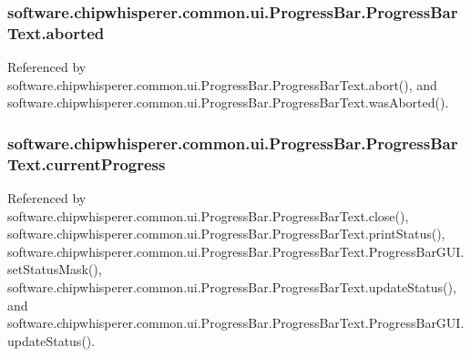 \subsubsection[{aborted}]{\setlength{\rightskip}{0pt plus 5cm}software.\+chipwhisperer.\+common.\+ui.\+Progress\+Bar.\+Progress\+Bar\+Text.\+aborted}\label{classsoftware_1_1chipwhisperer_1_1common_1_1ui_1_1ProgressBar_1_1ProgressBarText_a052477c7d2664f0188e8eec56ca57285}


Referenced by software.\+chipwhisperer.\+common.\+ui.\+Progress\+Bar.\+Progress\+Bar\+Text.\+abort(), and software.\+chipwhisperer.\+common.\+ui.\+Progress\+Bar.\+Progress\+Bar\+Text.\+was\+Aborted().

\hypertarget{classsoftware_1_1chipwhisperer_1_1common_1_1ui_1_1ProgressBar_1_1ProgressBarText_a090a37de67926fae5d5042142a064df7}{}
\subsubsection[{current\+Progress}]{\setlength{\rightskip}{0pt plus 5cm}software.\+chipwhisperer.\+common.\+ui.\+Progress\+Bar.\+Progress\+Bar\+Text.\+current\+Progress}\label{classsoftware_1_1chipwhisperer_1_1common_1_1ui_1_1ProgressBar_1_1ProgressBarText_a090a37de67926fae5d5042142a064df7}


Referenced by software.\+chipwhisperer.\+common.\+ui.\+Progress\+Bar.\+Progress\+Bar\+Text.\+close(), software.\+chipwhisperer.\+common.\+ui.\+Progress\+Bar.\+Progress\+Bar\+Text.\+print\+Status(), software.\+chipwhisperer.\+common.\+ui.\+Progress\+Bar.\+Progress\+Bar\+Text.\+Progress\+Bar\+G\+U\+I.\+set\+Status\+Mask(), software.\+chipwhisperer.\+common.\+ui.\+Progress\+Bar.\+Progress\+Bar\+Text.\+update\+Status(), and software.\+chipwhisperer.\+common.\+ui.\+Progress\+Bar.\+Progress\+Bar\+Text.\+Progress\+Bar\+G\+U\+I.\+update\+Status().

\hypertarget{classsoftware_1_1chipwhisperer_1_1common_1_1ui_1_1ProgressBar_1_1ProgressBarText_a71f54cd66ddbf27c5bdbbfb4f43c905d}{}
